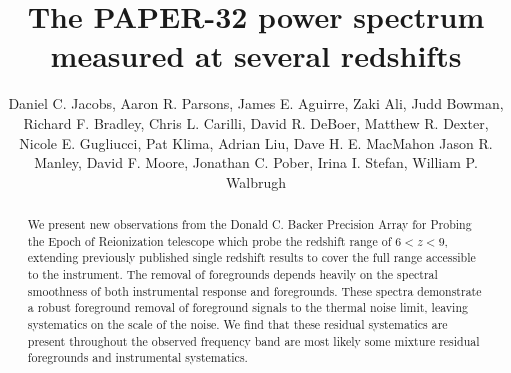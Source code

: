 \documentclass[preprint]{aastex}
\begin{document}
\title{The PAPER-32 power spectrum measured at several redshifts}
\author{
Daniel C. Jacobs,
Aaron R. Parsons,
James E. Aguirre,
Zaki Ali,
Judd Bowman,
Richard F. Bradley,
Chris L.  Carilli,
David R. DeBoer,
Matthew R. Dexter,
Nicole E. Gugliucci,
Pat Klima,
Adrian Liu,
Dave H. E. MacMahon
Jason R. Manley,
David F. Moore,
Jonathan C. Pober,
Irina I. Stefan,
William P. Walbrugh}


\begin{abstract}
We present new observations from the Donald C. Backer Precision Array for Probing the Epoch of Reionization telescope which probe the redshift range of $6<z<9$, extending previously published single redshift results to cover the full range accessible to the instrument.  The removal of foregrounds depends heavily on the spectral smoothness of both instrumental response and foregrounds.  These spectra demonstrate a robust foreground removal of foreground signals to the thermal noise limit, leaving systematics on the scale of the noise. We find that these residual systematics are present throughout the observed frequency band are most likely some mixture residual foregrounds and instrumental systematics.
\end{abstract}

\end{document}
